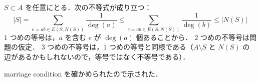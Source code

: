 \subsection{}
$S\subset A$ を任意にとる．次の不等式が成り立つ：
\[
 |S| = \sum_{e=ab\in E(S,N(S))}\frac{1}{\deg(a)} \leq \sum_{e=ab\in E(S,N(S))}\frac{1}{\deg(b)}\leq |N(S)|
\]
$1$ つめの等号は，$a$ を含む $e$ が $\deg(a)$ 個あることから．
$2$ つめの不等号は問題の仮定．
$3$ つめの不等号は，$1$ つめの等号と同様である（$A\setminus S$ と $N(S)$ の辺があるかもしれないので，等号ではなく不等号である）．

marriage condition を確かめられたので示された．
